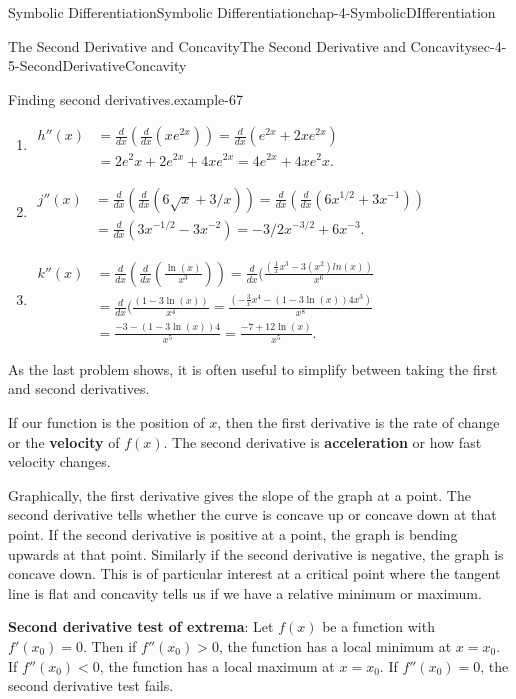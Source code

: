\documentclass[oneside,10pt,]{book}
\newcommand{\terminology}[1]{\textbf{#1}}
\numberwithin{equation}{section}
\newcommand{\lt}{<}
\newcommand{\gt}{>}
\newcommand{\amp}{&}
\begin{document}
\begin{chapterptx}{Symbolic Differentiation}{}{Symbolic Differentiation}{}{}{chap-4-SymbolicDIfferentiation}
\begin{sectionptx}{The Second Derivative and Concavity}{}{The Second Derivative and Concavity}{}{}{sec-4-5-SecondDerivativeConcavity}
\begin{example}{Finding second derivatives.}{example-67}
\begin{enumerate}[label=(\alph*)]
\item\hypertarget{li-527}{}\(\begin{aligned}  h'' (x)\amp =\frac{d}{dx} (\frac{d}{dx}  (x e^{2x} ))
=\frac{d}{dx} (e^{2x}+2xe^{2x} )\\ 
\amp =2e{^2}x+2e^{2x}+4xe^{2x}=4e^{2x}+4xe^2x.\end{aligned}\)%
\item\hypertarget{li-528}{}\(\begin{aligned}  j'' (x) \amp = \frac{d}{dx} (\frac{d}{dx}  (6 \sqrt{x}+3/x))=\frac{d}{dx} (\frac{d}{dx} (6x^{1/2}+3x^{-1} ))\\ 
\amp = \frac{d}{dx} (3x^{-1/2}-3x^{-2} )=-3/2 x^{-3/2}+6x^{-3}.\end{aligned}\)%
\item\hypertarget{li-529}{}\(\begin{aligned}   k'' (x) \amp = \frac{d}{dx} (\frac{d}{dx}  (\frac{\ln(x)}{x^3} ))=\frac{d}{dx} (\frac{(\frac{1}{x} x^3-3(x^2 )  ln(x))}{x^6 }\\
\amp = \frac{d}{dx} (\frac{(1-3 \ln(x))}{x^4 } 
= \frac{(-\frac{3}{x} x^4-(1-3 \ln(x) )4x^3)}{x^8} \\
\amp =\frac{-3-(1-3 \ln(x) )4}{x^5} = \frac{-7+12\ln(x)}{x^5}.\end{aligned} \)%
\end{enumerate}
\end{example}
\hypertarget{p-1797}{}%
As the last problem shows, it is often useful to simplify between taking the first and second derivatives.%
\par
\hypertarget{p-1798}{}%
If our function is the position of \(x\), then the first derivative is the rate of change or the \terminology{velocity} of \(f(x)\).  The second derivative is \terminology{acceleration} or how fast velocity changes.%
\par
\hypertarget{p-1799}{}%
Graphically, the first derivative gives the slope of the graph at a point.  The second derivative tells whether the curve is concave up or concave down at that point.  If the second derivative is positive at a point, the graph is bending upwards at that point.  Similarly if the second derivative is negative, the graph is concave down.  This is of particular interest at a critical point where the tangent line is flat and concavity tells us if we have a relative minimum or maximum.%
\par
\hypertarget{p-1800}{}%
\terminology{Second derivative test of extrema}: Let \(f(x)\) be a function with \(f'(x_0)=0\).  Then if \(f''(x_0) \gt 0\), the function has a local minimum at \(x=x_0\).  If \(f''(x_0) \lt 0\), the function has a local maximum at \(x=x_0\).  If \(f''(x_0)=0\), the second derivative test fails.%

\end{sectionptx}
\end{chapterptx}
\end{document}
